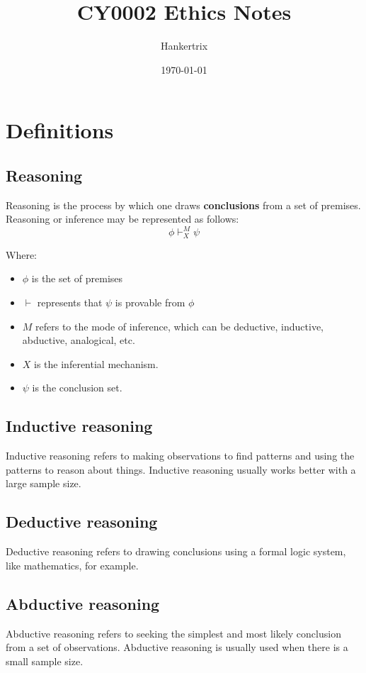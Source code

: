 \documentclass[11pt]{article}
\author{Hankertrix}
\date{\today}
\title{CY0002 Ethics Notes}
\begin{document}
\maketitle
\setcounter{tocdepth}{2}
\tableofcontents \clearpage\section{Definitions}
\label{sec:org6875271}

\subsection{Reasoning}
\label{sec:orgbd4699c}
Reasoning is the process by which one draws \textbf{conclusions} from a set of premises. Reasoning or inference may be represented as follows:
\[\phi \vdash^M_X \psi\]

Where:
\begin{itemize}
\item \(\phi\) is the set of premises
\item \(\vdash\) represents that \(\psi\) is provable from \(\phi\)
\item \(M\) refers to the mode of inference, which can be deductive, inductive, abductive, analogical, etc.
\item \(X\) is the inferential mechanism.
\item \(\psi\) is the conclusion set.
\end{itemize}
\subsection{Inductive reasoning}
\label{sec:orgb6bbfb4}
Inductive reasoning refers to making observations to find patterns and using the patterns to reason about things. Inductive reasoning usually works better with a large sample size.
\subsection{Deductive reasoning}
\label{sec:orgb23ff3e}
Deductive reasoning refers to drawing conclusions using a formal logic system, like mathematics, for example.
\subsection{Abductive reasoning}
\label{sec:org0ef5829}
Abductive reasoning refers to seeking the simplest and most likely conclusion from a set of observations. Abductive reasoning is usually used when there is a small sample size.
\end{document}

